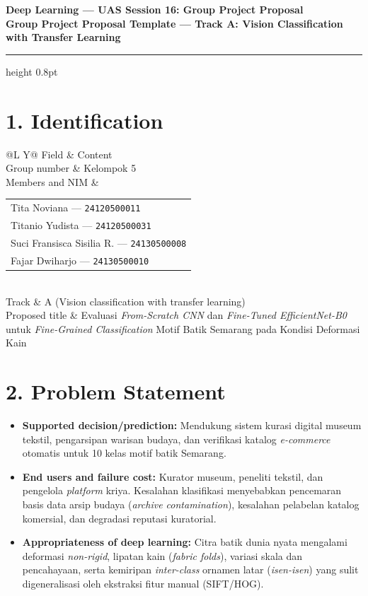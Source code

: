 \documentclass[9pt,a4paper]{extarticle}
\makeatletter
\renewcommand{\arraystretch}{1.12}
\newcommand{\proposalTable}[1]{%
    \renewcommand{\arraystretch}{1.14}%
    \begin{tabularx}{\textwidth}{@{}L Y@{}}
    \toprule[0.7pt]
    \textcolor{muted}{Field} & \textcolor{muted}{Content}\\
    \midrule
    #1
    \bottomrule[0.7pt]
    \end{tabularx}%
}
\makeatother
\begin{document}
\fontsize{9pt}{11pt}\selectfont

\begin{center}
    {\color{ink}\fontsize{14pt}{16pt}\selectfont\bfseries
    Deep Learning --- UAS Session 16: Group Project Proposal}\\[-1pt]
    {\color{accent}\fontsize{8.7pt}{10pt}\selectfont\bfseries
    Group Project Proposal Template --- Track A: Vision Classification with Transfer Learning}
\end{center}
\vspace{2pt}
\hrule height 0.8pt
\vspace{4pt}

\section*{1. Identification}
\proposalTable{%
    Group number & Kelompok 5\\
    Members and NIM & \begin{tabular}[t]{@{}l@{}}
        Tita Noviana --- \texttt{24120500011}\\
        Titanio Yudista --- \texttt{24120500031}\\
        Suci Fransisca Sisilia R. --- \texttt{24130500008}\\
        Fajar Dwiharjo --- \texttt{24130500010}
    \end{tabular}\\
    Track & A (Vision classification with transfer learning)\\
    Proposed title & Evaluasi \textit{From-Scratch CNN} dan \textit{Fine-Tuned EfficientNet-B0} untuk \textit{Fine-Grained Classification} Motif Batik Semarang pada Kondisi Deformasi Kain\\
}

\section*{2. Problem Statement}
\begin{itemize}
    \item \textbf{Supported decision/prediction:} Mendukung sistem kurasi digital museum tekstil, pengarsipan warisan budaya, dan verifikasi katalog \textit{e-commerce} otomatis untuk 10 kelas motif batik Semarang.
    \item \textbf{End users and failure cost:} Kurator museum, peneliti tekstil, dan pengelola \textit{platform} kriya. Kesalahan klasifikasi menyebabkan pencemaran basis data arsip budaya (\textit{archive contamination}), kesalahan pelabelan katalog komersial, dan degradasi reputasi kuratorial.
    \item \textbf{Appropriateness of deep learning:} Citra batik dunia nyata mengalami deformasi \textit{non-rigid}, lipatan kain (\textit{fabric folds}), variasi skala dan pencahayaan, serta kemiripan \textit{inter-class} ornamen latar (\textit{isen-isen}) yang sulit digeneralisasi oleh ekstraksi fitur manual (SIFT/HOG).
\end{itemize}
\end{document}
